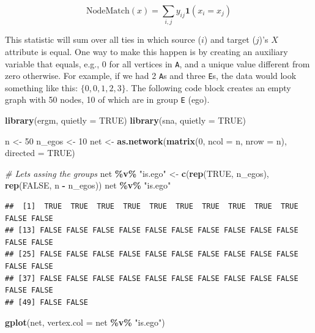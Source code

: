 \documentclass[
]{book}
\newenvironment{Shaded}{\begin{snugshade}}{\end{snugshade}}
\newcommand{\AttributeTok}[1]{\textcolor[rgb]{0.13,0.29,0.53}{#1}}
\newcommand{\CommentTok}[1]{\textcolor[rgb]{0.56,0.35,0.01}{\textit{#1}}}
\newcommand{\ConstantTok}[1]{\textcolor[rgb]{0.56,0.35,0.01}{#1}}
\newcommand{\DecValTok}[1]{\textcolor[rgb]{0.00,0.00,0.81}{#1}}
\newcommand{\FunctionTok}[1]{\textcolor[rgb]{0.13,0.29,0.53}{\textbf{#1}}}
\newcommand{\NormalTok}[1]{#1}
\newcommand{\OtherTok}[1]{\textcolor[rgb]{0.56,0.35,0.01}{#1}}
\newcommand{\SpecialCharTok}[1]{\textcolor[rgb]{0.81,0.36,0.00}{\textbf{#1}}}
\newcommand{\StringTok}[1]{\textcolor[rgb]{0.31,0.60,0.02}{#1}}
\begin{document}
\[
\text{NodeMatch}(x) = \sum_{i,j} y_{ij} \mathbf{1}({x_{i} = x_{j}})
\]

This statistic will sum over all ties in which source (\(i\)) and target (\(j\))'s \(X\) attribute is equal. One way to make this happen is by creating an auxiliary variable that equals, e.g., 0 for all vertices in \texttt{A}, and a unique value different from zero otherwise. For example, if we had 2 \texttt{A}s and three \texttt{E}s, the data would look something like this: \(\{0,0,1,2,3\}\). The following code block creates an empty graph with 50 nodes, 10 of which are in group \texttt{E} (ego).

\begin{Shaded}
\begin{Highlighting}[]
\FunctionTok{library}\NormalTok{(ergm, }\AttributeTok{quietly =}  \ConstantTok{TRUE}\NormalTok{)}
\FunctionTok{library}\NormalTok{(sna, }\AttributeTok{quietly =}  \ConstantTok{TRUE}\NormalTok{)}

\NormalTok{n }\OtherTok{\textless{}{-}} \DecValTok{50}
\NormalTok{n\_egos }\OtherTok{\textless{}{-}} \DecValTok{10}
\NormalTok{net }\OtherTok{\textless{}{-}} \FunctionTok{as.network}\NormalTok{(}\FunctionTok{matrix}\NormalTok{(}\DecValTok{0}\NormalTok{, }\AttributeTok{ncol =}\NormalTok{ n, }\AttributeTok{nrow =}\NormalTok{ n), }\AttributeTok{directed =} \ConstantTok{TRUE}\NormalTok{)}

\CommentTok{\# Let\textquotesingle{}s assing the groups}
\NormalTok{net }\SpecialCharTok{\%v\%} \StringTok{"is.ego"} \OtherTok{\textless{}{-}} \FunctionTok{c}\NormalTok{(}\FunctionTok{rep}\NormalTok{(}\ConstantTok{TRUE}\NormalTok{, n\_egos), }\FunctionTok{rep}\NormalTok{(}\ConstantTok{FALSE}\NormalTok{, n }\SpecialCharTok{{-}}\NormalTok{ n\_egos))}
\NormalTok{net }\SpecialCharTok{\%v\%} \StringTok{"is.ego"}
\end{Highlighting}
\end{Shaded}

\begin{verbatim}
##  [1]  TRUE  TRUE  TRUE  TRUE  TRUE  TRUE  TRUE  TRUE  TRUE  TRUE FALSE FALSE
## [13] FALSE FALSE FALSE FALSE FALSE FALSE FALSE FALSE FALSE FALSE FALSE FALSE
## [25] FALSE FALSE FALSE FALSE FALSE FALSE FALSE FALSE FALSE FALSE FALSE FALSE
## [37] FALSE FALSE FALSE FALSE FALSE FALSE FALSE FALSE FALSE FALSE FALSE FALSE
## [49] FALSE FALSE
\end{verbatim}

\begin{Shaded}
\begin{Highlighting}[]
\FunctionTok{gplot}\NormalTok{(net, }\AttributeTok{vertex.col =}\NormalTok{ net }\SpecialCharTok{\%v\%} \StringTok{"is.ego"}\NormalTok{)}
\end{Highlighting}
\end{Shaded}
\end{document}
